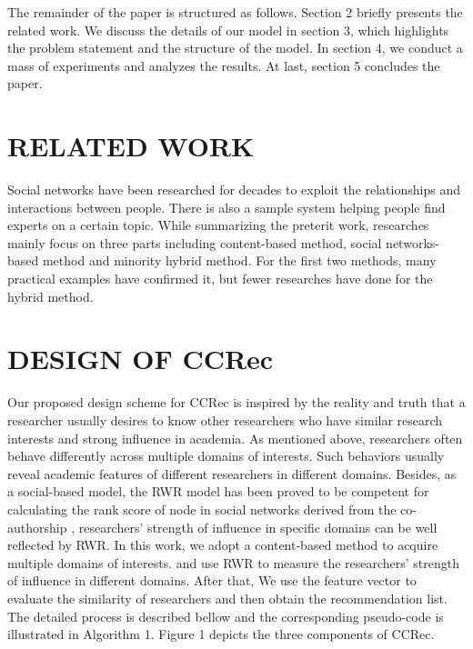 \documentclass{acm_proc_article-sp}
\begin{document}
The remainder of the paper is structured as follows. Section 2 briefly presents the related work. We discuss the details of our model in section 3, which highlights the problem statement and the structure of the model. In section 4, we conduct a mass of experiments and analyzes the results. At last, section 5 concludes the paper.
\section{RELATED WORK}
Social networks have been researched for decades to exploit the relationships and interactions between people. There is also a sample system helping people find experts on a certain topic. While summarizing the preterit work, researches mainly focus on three parts including content-based method, social networks-based method and minority hybrid method. For the first two methods, many practical examples have confirmed it, but fewer researches have done for the hybrid method. 

\section{DESIGN OF CCRec}
Our proposed design scheme for CCRec is inspired by the reality and truth that a researcher usually desires to know other researchers who have similar research interests and strong influence in academia. As mentioned above, researchers often behave differently across multiple domains of interests. Such behaviors usually reveal academic features of different researchers in different domains. Besides, as a social-based model, the RWR model has been proved to be competent for calculating the rank score of node in social networks derived from the co-authorship \cite{li2014acrec}, researchers' strength of influence in specific domains can be well reflected by RWR. In this work, we adopt a content-based method to acquire multiple domains of interests. and use RWR to measure the researchers' strength of influence in different domains. After that, We use the feature vector to evaluate the similarity of researchers and then obtain the recommendation list. The detailed process is described bellow and the corresponding pseudo-code is illustrated in Algorithm 1. Figure 1 depicts the three components of CCRec.
\end{document}
